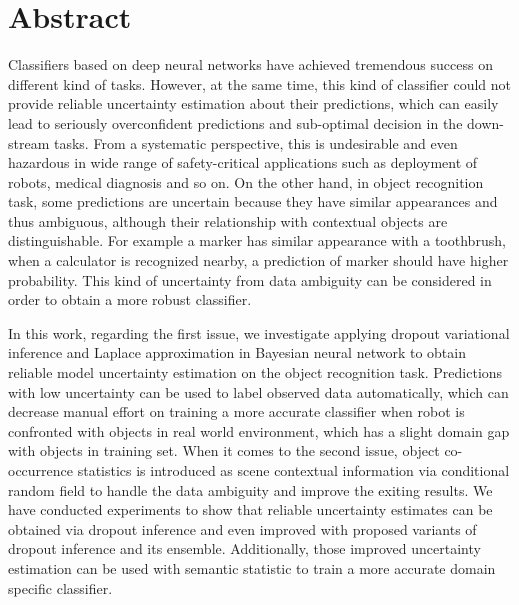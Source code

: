 
\thispagestyle{plain}

\section*{Abstract}

Classifiers based on deep neural networks have achieved tremendous success on different kind of tasks. However, at the same time, this kind of classifier could not provide reliable uncertainty estimation about their predictions, which can easily lead to seriously overconfident predictions and sub-optimal decision in the down-stream tasks. From a systematic perspective, this is undesirable and even hazardous in wide range of safety-critical applications such as deployment of robots, medical diagnosis and so on. On the other hand, in object recognition task, some predictions are uncertain because they have similar appearances and thus ambiguous, although their relationship with contextual objects are distinguishable. For example a marker has similar appearance with a toothbrush, when a calculator is recognized nearby, a prediction of marker should have higher probability. This kind of uncertainty from data ambiguity can be considered in order to obtain a more robust classifier.  

In this work, regarding the first issue, we investigate applying dropout variational inference and Laplace approximation in Bayesian neural network to obtain reliable model uncertainty estimation on the object recognition task. Predictions with low uncertainty can be used to label observed data automatically, which can decrease manual effort on training a more accurate classifier when robot is confronted with objects in real world environment, which has a slight domain gap with objects in training set. When it comes to the second issue, object co-occurrence statistics is introduced as scene contextual information via conditional random field to handle the data ambiguity and improve the exiting results. We have conducted experiments to show that reliable uncertainty estimates can be obtained via dropout inference and even improved with proposed variants of dropout inference and its ensemble. Additionally, those improved uncertainty estimation can be used with semantic statistic to train a more accurate domain specific classifier.

\switchlanguage{\lang} %

